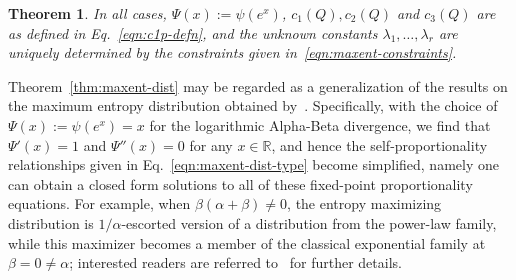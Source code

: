 \documentclass[11pt]{article}
\theoremstyle{plain}
\newtheorem{theorem}{Theorem}[section]
\theoremstyle{remark}
\def\R{\mathbb{R}}
\begin{document}
\begin{theorem}

    \noindent In all cases, $\Psi(x) := \psi(e^x)$, $c_1(Q), c_2(Q)$ and $c_3(Q)$ are as defined in Eq.~\eqref{eqn:c1p-defn}, and the unknown constants $\lambda_1, \dots, \lambda_r$ are uniquely determined by the constraints given in~\eqref{eqn:maxent-constraints}.
\end{theorem}

Theorem~\ref{thm:maxent-dist} may be regarded as a generalization of the results on the maximum entropy distribution obtained by~\cite{ghosh2021scale}. Specifically, with the choice of $\Psi(x) := \psi(e^x) = x$ for the logarithmic Alpha-Beta divergence, we find that $\Psi'(x)=1$ and $\Psi''(x) = 0$ for any $x \in \R$, and hence the self-proportionality relationships given in Eq.~\eqref{eqn:maxent-dist-type} become simplified, namely one can obtain a closed form solutions to all of these fixed-point proportionality equations. For example, when $\beta(\alpha+\beta) \neq 0$, the entropy maximizing distribution is $1/\alpha$-escorted version of a distribution from the power-law family, while this maximizer becomes a member of the classical exponential family at $\beta = 0 \neq \alpha$; interested readers are referred to~\cite{ghosh2021scale} for further details.
\end{document}
